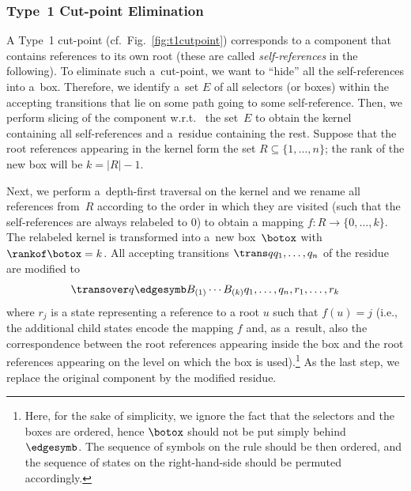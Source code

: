 {%
\subsubsection*{Type~1 Cut-point Elimination}

A Type~1 cut-point (cf.\ Fig.~\ref{fig:t1cutpoint}) corresponds to a component
that
contains references to its own root (these are called \emph{self-references} in the following).
To eliminate such a~cut-point, we want to ``hide'' all the self-references into a~box.
Therefore, we identify a~set $E$ of all selectors (or boxes) within the accepting
transitions that lie on some path going to some self-reference. 
Then, we perform
slicing of the component w.r.t.\
the set~$E$ to obtain the kernel containing all self-references and
a~residue containing the rest.
Suppose that the root references appearing in the kernel form the set $R
\subseteq \{1,\dots,n\}$; the rank of the new box will be $k = |R|-1$.

Next, we perform a~depth-first traversal on the kernel and we rename all
references from~$R$ according to the
order in which they are visited (such that the self-references are always
relabeled to $0$) to obtain a mapping $f : R \rightarrow \{0,\dots,k\}$.
The relabeled kernel
is transformed into a~new box~$\botox$ with $\rankof \botox = k$.
All accepting transitions
$\trans q {q_1,\dots,q_n}$ of the residue are modified to
%
$$
\transover q {\edgesymb B_{(1)}\cdots B_{(k)}} {q_1,\dots,q_n,r_1,\dots,r_k}
$$
%
where $r_j$ is a state representing a reference to a root $u$ such that
$f(u) = j$ (i.e., the additional child states encode the mapping $f$ and, as
a~result, also the correspondence between the root references appearing inside the box
and the root references appearing on the level on which the box is used).\footnote{
Here, for the sake of simplicity, we ignore the fact that the selectors and the boxes
are ordered, hence $\botox$ should not be put simply behind~$\edgesymb$.
The sequence of symbols on the rule should be then ordered, and the sequence of states on the right-hand-side should be permuted accordingly.}
As the last step, we replace the original component by the modified residue.

}
